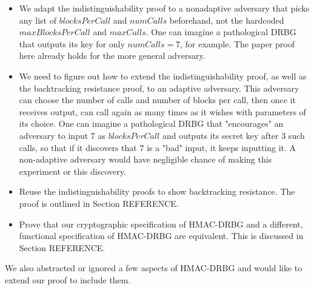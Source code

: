 \documentclass[12pt,lot, lof]{puthesis}
\begin{document}
{\begin{itemize}
\item We adapt the indistinguishability proof to a nonadaptive adversary that picks any list of $blocksPerCall$ and $numCalls$ beforehand, not the hardcoded $maxBlocksPerCall$ and $maxCalls$. One can imagine a pathological DRBG that outputs its key for only $numCalls = 7$, for example. The paper proof here already holds for the more general adversary.
\item We need to figure out how to extend the indistinguishability proof, as well as the backtracking resistance proof, to an adaptive adversary. This adversary can choose the number of calls and number of blocks per call, then once it receives output, can call again as many times as it wishes with parameters of its choice. One can imagine a pathological DRBG that "encourages" an adversary to input $7$ as $blocksPerCall$ and outputs its secret key after 3 such calls, so that if it discovers that $7$ is a "bad" input, it keeps inputting it. A non-adaptive adversary would have negligible chance of making this experiment or this discovery.
\item Reuse the indistinguishability proofs to show backtracking resistance. The proof is outlined in Section REFERENCE.
\item Prove that our cryptographic specification of HMAC-DRBG and a different, functional specification of HMAC-DRBG are equivalent. This is discussed in Section REFERENCE.
\end{itemize}

We also abstracted or ignored a few aspects of HMAC-DRBG and would like to extend our proof to include them.

}
\end{document}
